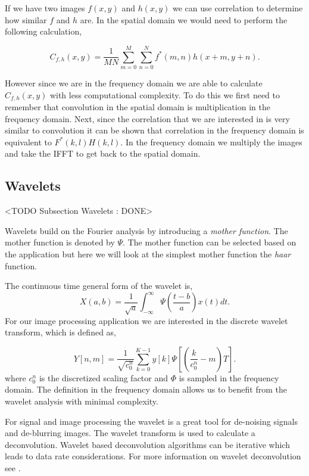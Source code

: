If we have two images $f(x,y)$ and $h(x,y)$ we can use correlation to determine how similar $f$ and $h$ are. In the spatial domain we would need to perform the following calculation,

\begin{equation}
C_{f,h}(x,y) = \frac{1}{MN}\sum_{m=0}^{M}\sum_{n=0}^{N}f^*(m,n)h(x+m,y+n).
\end{equation}
\noindent

However since we are in the frequency domain we are able to calculate $C_{f,h}(x,y)$ with less computational complexity. To do this we first need to remember that convolution in the spatial domain is multiplication in the frequency domain. Next, since the correlation that we are interested in is very similar to convolution it can be shown that correlation in the frequency domain is equivalent to $F^*(k,l)H(k,l)$. In the frequency domain we multiply the images and take the \ac{IFFT} to get back to the spatial domain. 

\subsection{Wavelets}
	<TODO Subsection Wavelets : DONE>

Wavelets build on the Fourier analysis by introducing a \emph{mother function}. The mother function is denoted by $\Psi$. The mother function can be selected based on the application but here we will look at the simplest mother function the \emph{haar} function.

The continuous time general form of the wavelet is,
\begin{equation}
X(a,b) = \frac{1}{\sqrt{a}}\int_{-\infty}^{\infty}\Psi\left(\frac{t-b}{a}\right) x(t)dt.
\end{equation}
\noindent
For our image processing application we are interested in the discrete wavelet transform, which is defined as,

\begin{equation}
Y[n,m] = \frac{1}{\sqrt{c_0^n}}\sum_{k=0}^{K-1}y[k]\Psi\left[\left(\frac{k}{c_0^n}-m\right)T\right].
\end{equation}
\noindent
where $c_0^n$ is the discretized scaling factor and $\Phi$ is sampled in the frequency domain. The definition in the frequency domain allows us to benefit from the wavelet analysis with minimal complexity. 

For signal and image processing the wavelet is a great tool for de-noising signals and de-blurring images. The wavelet transform is used to calculate a deconvolution. Wavelet based deconvolution algorithms can be iterative which leads to data rate considerations. For more information on wavelet deconvolution see \cite{akansu2010emerging}.


